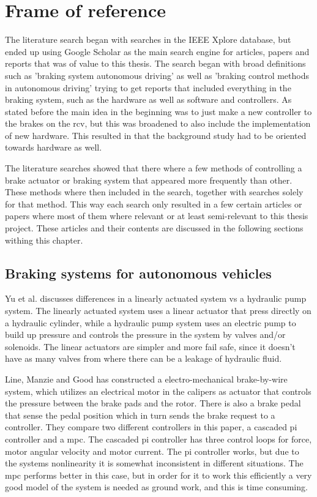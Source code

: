 \documentclass[a4paper,11pt]{kth-mag}
\begin{document}
\section{Frame of reference}
The literature search began with searches in the IEEE Xplore database, but ended up using Google Scholar as the main search engine for articles, papers and reports that was of value to this thesis. The search began with broad definitions such as 'braking system autonomous driving' as well as 'braking control methods in autonomous driving' trying to get reports that included everything in the braking system, such as the hardware as well as software and controllers. As stated before the main idea in the beginning was to just make a new controller to the brakes on the \gls{rcv}, but this was broadened to also include the implementation of new hardware. This resulted in that the background study had to be oriented towards hardware as well. 

The literature searches showed that there where a few methods of controlling a brake actuator or braking system that appeared more frequently than other. These methods where then included in the search, together with searches solely for that method. This way each search only resulted in a few certain articles or papers where most of them where relevant or at least semi-relevant to this thesis project. These articles and their contents are discussed in the following sections withing this chapter.



\subsection{Braking systems for autonomous vehicles}
Yu et al. \cite{Yu} discusses differences in a linearly actuated system vs a hydraulic pump system. The linearly actuated system uses a linear actuator that press directly on a hydraulic cylinder, while a hydraulic pump system uses an electric pump to build up pressure and controls the pressure in the system by valves and/or solenoids. The linear actuators are simpler and more fail safe, since it doesn't have as many valves from where there can be a leakage of hydraulic fluid. 


\vspace{5mm}
Line, Manzie and Good \cite{4475522} has constructed a electro-mechanical  brake-by-wire system, which utilizes an electrical motor in the calipers as actuator that controls the pressure between the brake pads and the rotor. There is also a brake pedal that sense the pedal position which in turn sends the brake request to a controller. They compare two different controllers in this paper, a cascaded \gls{pi} controller and a \gls{mpc}. The cascaded \gls{pi} controller has three control loops for force, motor angular velocity and motor current. The \gls{pi} controller works, but due to the systems nonlinearity it is somewhat inconsistent in different situations. The \gls{mpc} performs better in this case, but in order for it to work this efficiently a very good model of the system is needed as ground work, and this is time consuming. \newline
\end{document}
